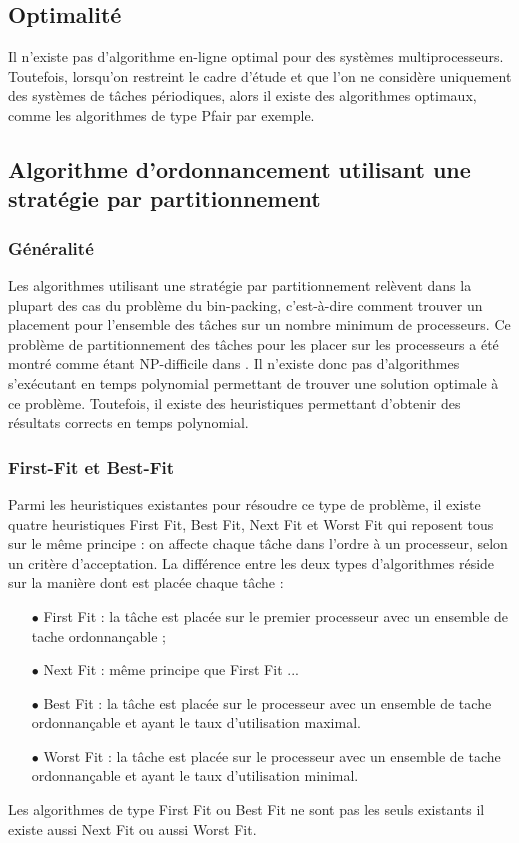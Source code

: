 \subsection{Optimalité}
\begin{theoreme}[\cite{HL92}]
Il n'existe pas d'algorithme en-ligne optimal pour des systèmes
multiprocesseurs. Toutefois, lorsqu'on restreint le cadre d'étude et
que l'on ne considère uniquement des systèmes de tâches périodiques,
alors il existe des algorithmes optimaux, comme les algorithmes de
type Pfair par exemple.
\end{theoreme}

\subsection{Algorithme d'ordonnancement utilisant une stratégie par partitionnement}
\subsubsection{Généralité}
Les algorithmes utilisant une stratégie par
partitionnement relèvent dans la plupart des cas du problème du
bin-packing, c'est-à-dire comment trouver un placement pour l'ensemble
des tâches sur un nombre minimum de processeurs.  Ce problème de
partitionnement des tâches pour les placer sur les processeurs a été
montré comme étant NP-difficile dans \cite{LW82}. Il n'existe donc pas
d'algorithmes s'exécutant en temps polynomial permettant de trouver
une solution optimale à ce problème. Toutefois, il existe des
heuristiques permettant d'obtenir des résultats corrects en temps
polynomial.
\subsubsection{First-Fit et Best-Fit}
Parmi les heuristiques existantes pour résoudre ce type de problème,
il existe quatre heuristiques First Fit, Best Fit, Next Fit et Worst
Fit qui reposent tous sur le même principe : on affecte chaque tâche
dans l'ordre à un processeur, selon un critère d'acceptation.  La
différence entre les deux types d'algorithmes réside sur la manière
dont est placée chaque tâche :
\begin{itemize}
\item[$\bullet$] First Fit : la tâche est placée sur le premier
  processeur avec un ensemble de tache ordonnançable ;
\item[$\bullet$] Next Fit : même principe que First Fit ...
\item[$\bullet$] Best Fit : la tâche est placée sur le processeur avec
  un ensemble de tache ordonnançable et ayant le taux d'utilisation
  maximal.
\item[$\bullet$] Worst Fit : la tâche est placée sur le processeur
  avec un ensemble de tache ordonnançable et ayant le taux
  d'utilisation minimal.
\end{itemize}
Les algorithmes de type First Fit ou Best Fit ne sont pas les seuls
existants il existe aussi Next Fit ou aussi Worst Fit.

